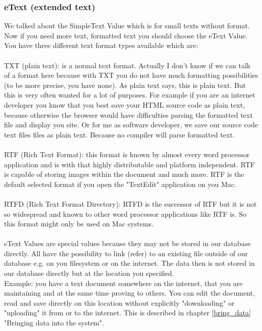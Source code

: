 \documentclass[12pt,a4]{article}
\begin{document}
\subsubsection{eText (extended text)}
\label{etext_datatype}
\medskip
We talked about the SimpleText Value which is for small texts without format. \\
Now if you need more text, formatted text you should choose the eText Value. \\
You have three different text format types available which are: \\
\\
TXT (plain text): is a normal text format. Actually I don't know if we can talk of a format here because with TXT you do not have much formatting possibilities (to be more precise, you have none). As plain text says, this is plain text. But this is very often wanted for a lot of purposes. For example if you are an internet developer you know that you best save your HTML source code as plain text, because otherwise the browser would have difficulties parsing the formatted text file and display you site. Or for me as software developer, we save our source code text files files as plain text. Because no compiler will parse formatted text. \\
\\
RTF (Rich Text Format): this format is known by almost every word processor application and is with that highly distributable and platform independent. RTF is capable of storing images within the document and much more. RTF is the default selected format if you open the "TextEdit" application on you Mac. \\
\\
RTFD (Rich Text Format Directory): RTFD is the successor of RTF but it is not so widespread and known to other word processor applications like RTF is. So this format might only be used on Mac systems. \\
\\ 
eText Values are special values because they may not be stored in our database directly. All have the possibility to link (refer) to an existing file outside of our database e.g. on you filesystem or on the internet. The data then is not stored in our database directly but at the location you specified. \\
Example: you have a text document somewhere on the internet, that you are maintaining and at the same time proving to others. You can edit the document, read and save directly on this location without explicitly "downloading" or "uploading" it from or to the internet. This is described in chapter \ref{bring_data} "Bringing data into the system".
\end{document}
